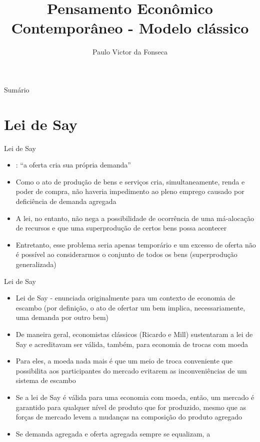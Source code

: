 \documentclass[10pt]{beamer}
\title[]{Pensamento Econômico Contemporâneo - Modelo clássico}
\author[]{Paulo Victor da Fonseca}
\date{}
\begin{document}
\begin{frame}[plain]
\end{frame}

\begin{frame}{Sumário}
    \tableofcontents
\end{frame}

\section{Lei de Say}
\begin{frame}
    {Lei de Say}
    \begin{itemize}
        \item {}: ``a oferta cria sua própria demanda'' \bigskip
        \item Como o ato de produção de bens e serviços cria, simultaneamente, renda e poder de compra, não haveria impedimento ao pleno emprego causado por deficiência de demanda agregada\bigskip
        \item A lei, no entanto, não nega a possibilidade de ocorrência de uma má-alocação de recursos e que uma superprodução de certos bens possa acontecer\bigskip
        \item Entretanto, esse problema seria apenas temporário e um excesso de oferta não é possível ao considerarmos o conjunto de todos os bens (superprodução generalizada) 
    \end{itemize}
\end{frame}

\begin{frame}
    {Lei de Say}
    \begin{itemize}
        \item Lei de Say - enunciada originalmente para um contexto de economia de escambo (por definição, o ato de ofertar um bem implica, necessariamente, uma demanda por outro bem)\bigskip
        \item De maneira geral, economistas clássicos (Ricardo e Mill) sustentaram a lei de Say e acreditavam ser válida, também, para economia de trocas com moeda\bigskip
        \item Para eles, a moeda nada mais é que um meio de troca conveniente que possibilita aos participantes do mercado evitarem as inconveniências de um sistema de escambo\bigskip
        \item Se a lei de Say é válida para uma economia com moeda, então, um mercado é garantido para qualquer nível de produto que for produzido, mesmo que as forças de mercado levem a mudanças na composição do produto agregado\bigskip
        \item Se demanda agregada e oferta agregada sempre se equalizam, a 
    \end{itemize}
\end{frame}
\end{document}
